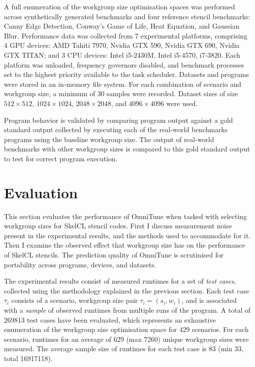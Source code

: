 \documentclass[nonatbib,preprint,9pt]{sigplanconf}
\begin{document}
A full enumeration of the workgroup size optimisation spaces was
performed across synthetically generated benchmarks and four reference
stencil benchmarks: Canny Edge Detection, Conway's Game of Life, Heat
Equation, and Gaussian Blur. Performance data was collected from 7
experimental platforms, comprising 4 GPU devices: AMD Tahiti 7970,
Nvidia GTX 590, Nvidia GTX 690, Nvidia GTX TITAN; and 3 CPU devices:
Intel i5-2430M, Intel i5-4570, i7-3820.  Each platform was unloaded,
frequency governors disabled, and benchmark processes set to the
highest priority available to the task scheduler. Datasets and
programs were stored in an in-memory file system. For each combination
of scenario and workgroup size, a minimum of 30 samples were
recorded. Dataset sizes of size $512\times512$, $1024\times1024$,
$2048\times2048$, and $4096\times4096$ were used.

Program behavior is validated by comparing program output against a
gold standard output collected by executing each of the real-world
benchmarks programs using the baseline workgroup size. The output of
real-world benchmarks with other workgroup sizes is compared to this
gold standard output to test for correct program execution.


\section{Evaluation}\label{sec:evaluation}

This section evaluates the performance of OmniTune when tasked with
selecting workgroup sizes for SkelCL stencil codes. First I discuss
measurement noise present in the experimental results, and the methods
used to accommodate for it. Then I examine the observed effect that
workgroup size has on the performance of SkelCL stencils. The
prediction quality of OmniTune is scrutinised for portability across
programs, devices, and datasets.



The experimental results consist of measured runtimes for a set of
\emph{test cases}, collected using the methodology explained in the
previous section. Each test case $\tau_i$ consists of a scenario,
workgroup size pair $\tau_i = (s_i,w_i)$, and is associated with a
\emph{sample} of observed runtimes from multiple runs of the
program. A total of 269813 test cases have been evaluated, which
represents an exhaustive enumeration of the workgroup size
optimisation space for 429 scenarios. For each scenario, runtimes for
an average of 629 (max 7260) unique workgroup sizes were measured. The
average sample size of runtimes for each test case is 83 (min 33,
total 16917118).
\end{document}

